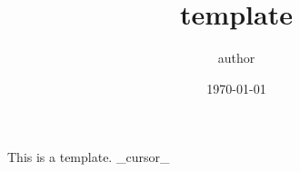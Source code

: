 \documentclass[dvipdfmx,uplatex,titlepage]{jsarticle}
\title{template}
\author{author}
\date{\today}
\begin{document}
\maketitle
This is a template.
{{_cursor_}}
\end{document}

